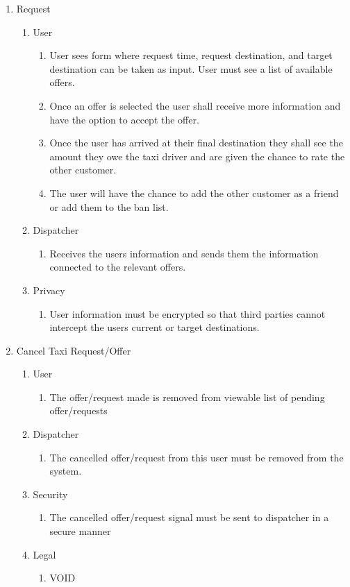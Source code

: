 \documentclass[english]{article}
\begin{document}
\begin{enumerate}[{BE}1.]
	\item Request		
	\begin{enumerate}[{VP6}.1]
		\item User
			\begin{enumerate}
				\item User sees form where request time, request destination, and target destination can be taken as input. User must see a list of available offers. 
				\item Once an offer is selected the user shall receive more information and have the option to accept the offer. 
				\item Once the user has arrived at their final destination they shall see the amount they owe the taxi driver and are given the chance to rate the other customer. 
				\item The user will have the chance to add the other customer as a friend or add them to the ban list. 
			\end{enumerate}
		\item Dispatcher
			\begin{enumerate}
				\item Receives the users information and sends them the information connected to the relevant offers.
			\end{enumerate}
		\item Privacy
			\begin{enumerate}
				\item User information must be encrypted so that third parties cannot intercept the users current or target destinations.
			\end{enumerate}
	\end{enumerate}
	
	\item Cancel Taxi Request/Offer
	\begin{enumerate}[{VP7}.1]
		\item User
			\begin{enumerate}
				\item The offer/request made is removed from viewable list of pending offer/requests
			\end{enumerate}
		\item Dispatcher
			\begin{enumerate}
				\item The cancelled offer/request from this user must be removed from the system.
			\end{enumerate}
		\item Security
			\begin{enumerate}
				\item The cancelled offer/request signal must be sent to dispatcher in a secure manner
			\end{enumerate}
		\item Legal
			\begin{enumerate}
				\item VOID
			\end{enumerate}
	\end{enumerate}
	

\end{enumerate}
\end{document}

